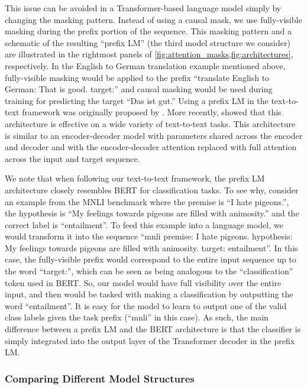 This issue can be avoided in a Transformer-based language model simply by changing the masking pattern. Instead of using a causal mask, we use fully-visible masking during the prefix portion of the sequence. This masking pattern and a schematic of the resulting ``prefix LM'' (the third model structure we consider) are illustrated in the rightmost panels of \ref{fig:attention_masks,fig:architectures}, respectively. In the English to German translation example mentioned above, fully-visible masking would be applied to the prefix ``translate English to German: That is good. target:'' and causal masking would be used during training for predicting the target ``Das ist gut.'' Using a prefix LM in the text-to-text framework was originally proposed by \cite{liu2018generating}. More recently, \cite{dong2019unified} showed that this architecture is effective on a wide variety of text-to-text tasks. This architecture is similar to an encoder-decoder model with parameters shared across the encoder and decoder and with the encoder-decoder attention replaced with full attention across the input and target sequence.

We note that when following our text-to-text framework, the prefix LM architecture closely resembles BERT \citep{devlin2018bert} for classification tasks. To see why, consider an example from the MNLI benchmark where the premise is ``I hate pigeons.'', the hypothesis is ``My feelings towards pigeons are filled with animosity.'' and the correct label is ``entailment''. To feed this example into a language model, we would transform it into the sequence ``mnli premise: I hate pigeons. hypothesis: My feelings towards pigeons are filled with animosity. target: entailment''. In this case, the fully-visible prefix would correspond to the entire input sequence up to the word ``target:'', which can be seen as being analogous to the ``classification'' token used in BERT. So, our model would have full visibility over the entire input, and then would be tasked with making a classification by outputting the word ``entailment''. It is easy for the model to learn to output one of the valid class labels given the task prefix (``mnli'' in this case). As such, the main difference between a prefix LM and the BERT architecture is that the classifier is simply integrated into the output layer of the Transformer decoder in the prefix LM.

\subsubsection{Comparing Different Model Structures}
\label{sec:architecture_variants}

